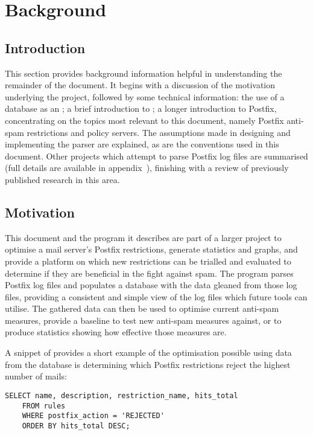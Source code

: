 \section{Background}

\label{background}

\subsection{Introduction}

This section provides background information helpful in understanding the
remainder of the document.  It begins with a discussion of the motivation
underlying the project, followed by some technical information: the use of
a database as an \API{}\@; a brief introduction to \SMTP{}\@; a longer
introduction to Postfix, concentrating on the topics most relevant to this
document, namely Postfix anti-spam restrictions and policy servers.  The
assumptions made in designing and implementing the parser are explained, as
are the conventions used in this document.  Other projects which attempt to
parse Postfix log files are summarised (full details are available in
appendix~), finishing with a review of
previously published research in this area.

\subsection{Motivation}

\label{motivation}

This document and the program it describes are part of a larger project to
optimise a mail server's Postfix restrictions, generate statistics and
graphs, and provide a platform on which new restrictions can be trialled
and evaluated to determine if they are beneficial in the fight against
spam.  The program parses Postfix log files and populates a database with
the data gleaned from those log files, providing a consistent and simple
view of the log files which future tools can utilise.  The gathered data
can then be used to optimise current anti-spam measures, provide a baseline
to test new anti-spam measures against, or to produce statistics showing
how effective those measures are.

A snippet of \SQL{} provides a short example of the optimisation possible
using data from the database is determining which Postfix restrictions
reject the highest number of mails:

\begin{verbatim}
SELECT name, description, restriction_name, hits_total
    FROM rules
    WHERE postfix_action = 'REJECTED'
    ORDER BY hits_total DESC;
\end{verbatim}

